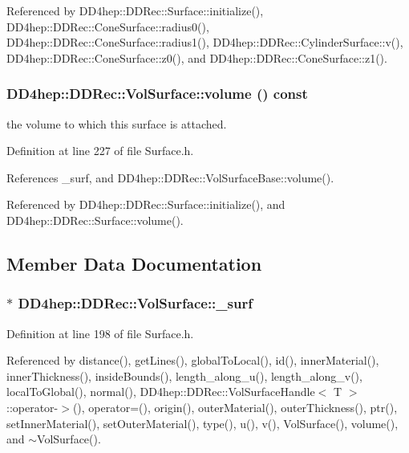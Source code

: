 Referenced by DD4hep::DDRec::Surface::initialize(), DD4hep::DDRec::ConeSurface::radius0(), DD4hep::DDRec::ConeSurface::radius1(), DD4hep::DDRec::CylinderSurface::v(), DD4hep::DDRec::ConeSurface::z0(), and DD4hep::DDRec::ConeSurface::z1().\hypertarget{class_d_d4hep_1_1_d_d_rec_1_1_vol_surface_a05dae0ef8a5e373148eb8ec788c2797f}{
\subsubsection[{volume}]{ DD4hep::DDRec::VolSurface::volume () const}}
\label{class_d_d4hep_1_1_d_d_rec_1_1_vol_surface_a05dae0ef8a5e373148eb8ec788c2797f}


the volume to which this surface is attached. 

Definition at line 227 of file Surface.h.

References \_\-surf, and DD4hep::DDRec::VolSurfaceBase::volume().

Referenced by DD4hep::DDRec::Surface::initialize(), and DD4hep::DDRec::Surface::volume().

\subsection{Member Data Documentation}
\hypertarget{class_d_d4hep_1_1_d_d_rec_1_1_vol_surface_a434add1326a87d6d6e5ee0209777cd45}{
\subsubsection[{\_\-surf}]{$\ast$ {\bf DD4hep::DDRec::VolSurface::\_\-surf}}}
\label{class_d_d4hep_1_1_d_d_rec_1_1_vol_surface_a434add1326a87d6d6e5ee0209777cd45}


Definition at line 198 of file Surface.h.

Referenced by distance(), getLines(), globalToLocal(), id(), innerMaterial(), innerThickness(), insideBounds(), length\_\-along\_\-u(), length\_\-along\_\-v(), localToGlobal(), normal(), DD4hep::DDRec::VolSurfaceHandle$<$ T $>$::operator-\/$>$(), operator=(), origin(), outerMaterial(), outerThickness(), ptr(), setInnerMaterial(), setOuterMaterial(), type(), u(), v(), VolSurface(), volume(), and $\sim$VolSurface().

